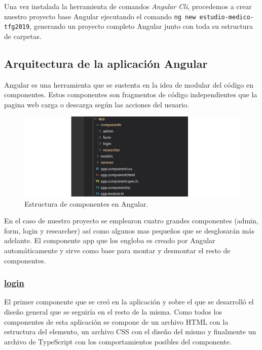     \FloatBarrier
    
    Una vez instalada la herramienta de comandos \textit{Angular Cli}, procedemos a crear nuestro proyecto base Angular ejecutando el comando \texttt{ng new estudio-medico-tfg2019}, generando un proyecto completo Angular junto con toda su estructura de carpetas.
    
    
    
    \subsection{Arquitectura de la aplicación Angular}
    
    Angular es una herramienta que se sustenta en la idea de modular del código en componentes. Estos componentes son fragmentos de código independientes que la pagina web carga o descarga según las acciones del usuario. 
    
    \begin{figure}[h]
    \centering
     \includegraphics[width=1\textwidth]{images/componentesAngular.jpg}
    \caption{Estructura de componentes en Angular.}
    \end{figure}
    
     \FloatBarrier
    
    En el caso de nuestro proyecto se emplearon cuatro grandes componentes (admin, form, login y researcher) así como algunos mas pequeños que se desglosarán más adelante. El componente app que los engloba es creado por Angular automáticamente y sirve como base para montar y desmontar el resto de componentes.
    
    \subsubsection{\underline{login}}

    El primer componente que se creó en la aplicación y sobre el que se desarrolló el diseño general que se seguiría en el resto de la misma. Como todos los componentes de esta aplicación se compone de un archivo HTML con la estructura del elemento, un archivo CSS con el diseño del mismo y finalmente un archivo de TypeScript con los comportamientos posibles del componente.\newline
    
